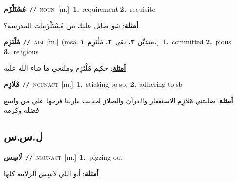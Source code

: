 \documentclass[10pt,a4paper,twoside]{article} %
\begin{document}
\begin{multicols}{2}
{\setlength\topsep{0pt}\textbf{\foreignlanguage{arabic}{مُسْتَلْزَم}}\ {\color{gray}\texttt{//}\color{black}}\ \textsc{noun}\ [m.]\ \textbf{1.}~requirement  \textbf{2.}~requisite\  \begin{flushright}\color{gray}\foreignlanguage{arabic}{\textbf{\underline{\foreignlanguage{arabic}{أمثلة}}}: شو ضايل عليك من مُسْتَلْزَمات المدرسة؟}\end{flushright}\color{black}} \vspace{2mm}

{\setlength\topsep{0pt}\textbf{\foreignlanguage{arabic}{مُلْتَزِم}}\ {\color{gray}\texttt{//}\color{black}}\ \textsc{adj}\ [m.]\ \color{gray}(msa. \foreignlanguage{arabic}{متديِّن}~\foreignlanguage{arabic}{\textbf{٣.}}  \foreignlanguage{arabic}{تقي}~\foreignlanguage{arabic}{\textbf{٢.}}  \foreignlanguage{arabic}{مُلْتَزِم}~\foreignlanguage{arabic}{\textbf{١.}})\color{black}\ \textbf{1.}~committed  \textbf{2.}~pious  \textbf{3.}~religious\  \begin{flushright}\color{gray}\foreignlanguage{arabic}{\textbf{\underline{\foreignlanguage{arabic}{أمثلة}}}: حكيم مُلْتَزِم وملتحي ما شاء الله عليه}\end{flushright}\color{black}} \vspace{2mm}

{\setlength\topsep{0pt}\textbf{\foreignlanguage{arabic}{مْلَازِم}}\ {\color{gray}\texttt{//}\color{black}}\ \textsc{noun\textunderscore act}\ [m.]\ \textbf{1.}~sticking to sb.  \textbf{2.}~adhering to sb\  \begin{flushright}\color{gray}\foreignlanguage{arabic}{\textbf{\underline{\foreignlanguage{arabic}{أمثلة}}}: ضليتني مْلازِم الاستغفار والقرآن والصلاز لحديت ماربنا فرجها علي من واسع فضله وكرمه}\end{flushright}\color{black}} \vspace{2mm}

\vspace{-3mm}
\subsection*{\color{blue}\foreignlanguage{arabic}{ل.س.س}\color{blue}{}} 

{\setlength\topsep{0pt}\textbf{\foreignlanguage{arabic}{لَاسِس}}\ {\color{gray}\texttt{//}\color{black}}\ \textsc{noun\textunderscore act}\ [m.]\ \textbf{1.}~pigging out\  \begin{flushright}\color{gray}\foreignlanguage{arabic}{\textbf{\underline{\foreignlanguage{arabic}{أمثلة}}}: أنو اللي لاسِس الزلابية كلها}\end{flushright}\color{black}} \vspace{2mm}


\end{multicols}
\end{document}
